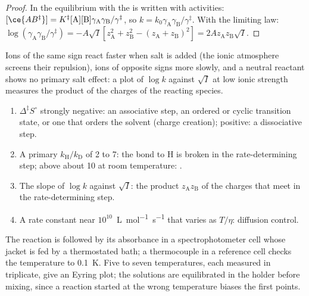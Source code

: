 \begin{proof}
In  the equilibrium with the  is written
with activities: $[\ce{AB^{\ddagger}}] = K^{\ddagger}[\mathrm A][\mathrm B]\gamma_{\mathrm A}\gamma_{\mathrm B}/\gamma^{\ddagger}$, so $k = k_0\gamma_{\mathrm A}\gamma_{\mathrm B}/\gamma^{\ddagger}$.
With the limiting law: $\log(\gamma_{\mathrm A}\gamma_{\mathrm B}/\gamma^{\ddagger}) = -A\sqrt I[z_{\mathrm A}^2 + z_{\mathrm B}^2 - (z_{\mathrm A} + z_{\mathrm B})^2] =
2Az_{\mathrm A}z_{\mathrm B}\sqrt I$.
\end{proof}

Ions of the same sign react faster when salt is added (the ionic atmosphere
screens their repulsion), ions of opposite signs more slowly, and a neutral
reactant shows no primary salt effect: a plot of $\log k$ against $\sqrt I$ at low
ionic strength measures the product of the charges of the reacting species.

\begin{method}\label{met:b3:rate-theories:mechanism-evidence}
\begin{enumerate}
  \item $\Delta^{\ddagger}S^\circ$ strongly negative: an associative step, an ordered or cyclic
        transition state, or one that orders the solvent (charge creation);
        positive: a dissociative step.
  \item A primary $k_{\mathrm H}/k_{\mathrm D}$ of 2 to 7: the bond to H is broken in the
        rate-determining step; above about 10 at room temperature: .
  \item The slope of $\log k$ against $\sqrt I$: the product $z_{\mathrm A}z_{\mathrm B}$ of the charges that
        meet in the rate-determining step.
  \item A rate constant near $10^{10}$~\unit{L.mol^{-1}.s^{-1}} that varies as $T/\eta$:
        diffusion control.
\end{enumerate}
\end{method}

\begin{inthelab}
The reaction is followed by its absorbance in a spectrophotometer cell whose
jacket is fed by a thermostated bath; a thermocouple in a reference cell checks
the temperature to \qty{0.1}{K}. Five to seven temperatures, each measured in
triplicate, give an Eyring plot; the solutions are equilibrated in the
holder before mixing, since a reaction started at the wrong temperature biases
the first points.
\end{inthelab}

